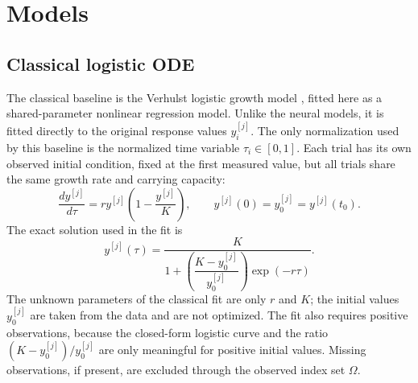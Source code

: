 \documentclass[11pt]{article}
\begin{document}
\section{Models}

    \subsection{Classical logistic ODE}
            The classical baseline is the Verhulst logistic growth model
        \citep{verhulst1838notice}, fitted here as a shared-parameter nonlinear
        regression model. Unlike the neural models, it is fitted directly to the
        original response values $y_i^{[j]}$. The only normalization used by
        this baseline is the normalized time variable $\tau_i\in[0,1]$. Each
        trial has its own observed initial condition, fixed at the first
        measured value, but all trials share the same growth rate and carrying
        capacity:
        $$
            \frac{d y^{[j]}}{d\tau}
            =
            r y^{[j]}\left(1-\frac{y^{[j]}}{K}\right),
            \qquad
            y^{[j]}(0)=y_0^{[j]}=y^{[j]}(t_0).
        $$
        The exact solution used in the fit is
        $$
            y^{[j]}(\tau)
            =
                \dfrac{K}{
                    1 +
                    \left(
                        \dfrac{K - y_0^{[j]}}{ y_0^{[j]} }
                    \right)
                    \exp(-r\tau)
                }.
        $$
        The unknown parameters of the classical fit are only $r$ and $K$; the
        initial values $y_0^{[j]}$ are taken from the data and are not
        optimized. The fit also requires positive observations, because the
        closed-form logistic curve and the ratio $(K-y_0^{[j]})/y_0^{[j]}$ are
        only meaningful for positive initial values.
        Missing observations, if present, are excluded through the observed
        index set $\Omega$.
\end{document}
